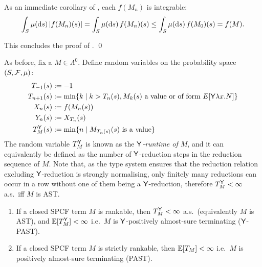 As an immediate corollary of , each $f(M_n)$ is integrable:
\[
\int_{S} \mu(\mathrm{d} s) \, |f(M_n)(s)| 
=
\int_{S} \mu(\mathrm{d} s) \, f(M_n)(s)
\leq
\int_{S} \mu(\mathrm{d} s) \, f(M_0)(s)
=
f(M).
\]

\iffalse
[** To see $f_{2, n+1}(M) \leq f(M_n)[T_2]$, take $s \in T_2$. Then $f_{2, n+1}(M)(s) = f(E[\underline{a}])$ and $M_n = E[\tsample]$, for some $a \in [0, 1]$ and evaluation context $E$. Hence 
\[
f_{2, n+1}(M)(s) \leq \int_I f(E[\underline{r}]) \, \mu_{leb}(\textrm{d} r)
\leq f(E[\tsample]) = f(M_n)[T_2](s).
\]
**]
\fi
This concludes the proof of %
. \hfill \qed

\medskip
As before, fix a $M \in \Lambda^0$.
Define random variables on the probability space $(S, \mathcal{F}, \mu)$:
\begin{align}
T_{-1}(s) & := -1 \nonumber \\
T_{n+1}(s) & := \min \{ k \mid k>T_n(s), M_k(s) \textrm{ a value or of form } E[\mathsf{Y} \lambda x. N] \} \nonumber \\
X_n(s) & := f(M_n(s)) \nonumber \\
Y_n(s) & := X_{T_n}(s) \nonumber \\
T_M^{\mathsf{Y}}(s) &:= \min \{n \mid M_{T_n(s)}(s) \textrm{ is a value}\} \label{eq:y stopping time}
\end{align}
The random variable $T_M^{\mathsf{Y}}$ is known as the \emph{$\mathsf{Y}$-runtime of $M$}, and it can equivalently be defined as the number of $\mathsf{Y}$-reduction steps in the reduction sequence of $M$. Note that, as the type system ensures that the reduction relation excluding $\mathsf{Y}$-reduction is strongly normalising, only finitely many reductions can occur in a row without one of them being a $\mathsf{Y}$-reduction, therefore $T_M^{\mathsf{Y}} < \infty$ a.s.~iff $M$ is AST.

\begin{theorem}[Soundness] \label{thm:rankable implies termination}
\begin{enumerate}
\item If a closed SPCF term $M$ is rankable, then $T^{\mathsf{Y}}_M < \infty$ a.s.~(equivalently $M$ is AST), and $\mathbb{E}[T^{\mathsf{Y}}_M] < \infty$ i.e.~$M$ is $\mathsf{Y}$-positively almost-sure terminating ($\mathsf{Y}$-PAST). 

\item If a closed SPCF term $M$ is strictly rankable, then $\mathbb{E}[T_M] < \infty$ i.e.~$M$ is positively almost-sure terminating (PAST).
\end{enumerate}
\end{theorem}


